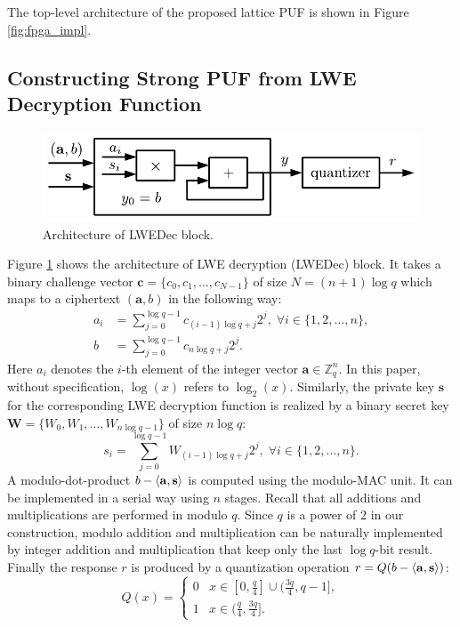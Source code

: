 The top-level architecture of the proposed lattice PUF is shown in Figure \ref{fig:fpga_impl}.



\subsection{Constructing Strong PUF from LWE Decryption Function}
\label{sec:lwe_dec}
\begin{figure}[t!]
    \centering
    \includegraphics[width = 0.8\linewidth]{./figs/lwe_dec.pdf}
    \caption{Architecture of LWEDec block.}
    \label{fig:lwedec}
\end{figure}

Figure \ref{fig:lwedec} shows the architecture of LWE decryption (LWEDec) block. 
It takes a binary challenge vector $\mathbf{c} = \{c_0,c_1,\ldots,c_{N-1}\}$ of size $N = (n+1)\log q$ which maps to a ciphertext $(\mathbf{a},b)$ in the following way:
\begin{align*}
a_i &= \sum_{j=0}^{\log q-1}c_{(i-1)\log q+j}2^j,\; \forall i\in \{1,2,\ldots,n\}, \\
b &= \sum_{j=0}^{\log q-1}c_{n\log q+j}2^j. 
\end{align*}
Here $a_i$ denotes the $i$-th element of the integer vector $\mathbf{a}\in\mathbb{Z}_q^n$.
In this paper, without specification, $\log(x)$ refers to $\log_2(x)$.
Similarly, the private key $\mathbf{s}$ for the corresponding LWE decryption function is realized by a binary secret key $\mathbf{W} =\{W_0,W_1,\ldots,W_{n\log q-1}\} $ of size $n\log q$:
\begin{equation*}
s_i=\sum_{j=0}^{\log q-1} W_{(i-1)\log q+j} 2^j,\; \forall i\in \{1,2,\ldots,n\}.
\end{equation*}
A modulo-dot-product $b-\langle\mathbf{a},\mathbf{s}\rangle$ is computed using the modulo-MAC unit. 
It can be implemented in a serial way using $n$ stages. 
Recall that all additions and multiplications are performed in modulo $q$.
Since $q$ is a power of $2$ in our construction, modulo addition and multiplication can be naturally implemented by integer addition and multiplication that keep only the last $\log q$-bit result. 
Finally the response $r$ is produced by a quantization operation $r = Q(b-\langle\mathbf{a},\mathbf{s}\rangle)$: 
\begin{equation*}
Q(x) = \begin{cases}
	0& x \in [0,\frac{q}{4}]\cup(\frac{3q}{4},q-1],\\
	1& x \in (\frac{q}{4},\frac{3q}{4}].
\end{cases}
\end{equation*}

